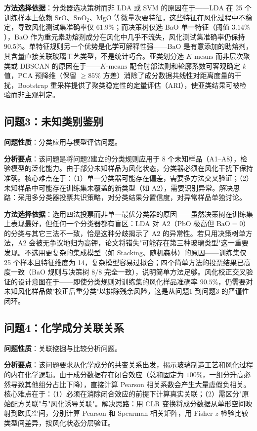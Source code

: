 \textbf{方法选择依据}：分类器选决策树而非 LDA 或 SVM 的原因在于——LDA 在 25 个训练样本上依赖 SrO、$\text{SnO}_2$、MgO 等微量次要特征，这些特征在风化过程中不稳定，导致风化测试集准确率仅 $61.9\%$；而决策树仅选 BaO 单一特征（阈值 $3.14\%$），BaO 作为重元素助熔剂成分在风化中几乎不流失，风化测试集准确率仍保持 $90.5\%$。单特征规则另一个优势是化学可解释性强——BaO 是有意添加的助熔剂，其含量直接关联玻璃工艺类型，不是统计巧合。亚类划分选 $K\text{-means}$ 而非层次聚类或 DBSCAN 的原因在于——$K\text{-means}$ 配合肘部法则和轮廓系数可客观确定 $k$ 值，PCA 预降维（保留 $\geq 85\%$ 方差）消除了成分数据共线性对距离度量的干扰，Bootstrap 重采样提供了聚类稳定性的定量评估（ARI），使亚类结果可被检验而非主观判定。

\subsection{问题3：未知类别鉴别}

\textbf{问题性质}：分类应用与模型评估问题。

\textbf{分析要点}：该问题是将问题2建立的分类规则应用于 8 个未知样品（A1--A8），检验模型的泛化能力。由于部分未知样品为风化状态，分类器必须在风化干扰下保持准确。核心难点在于：（1）单一分类器可能存在偏差，需要多方法交叉验证；（2）未知样品中可能存在训练集未覆盖的新类型（如 A2），需要识别异常。解决思路：采用多分类器投票共识策略，对分类结果分置信度，对异常样品单独讨论。

\textbf{方法选择依据}：选用四法投票而非单一最优分类器的原因——虽然决策树在训练集上表现最好，但任何一个分类器都有盲区：LDA 对 A2（PbO 极高但 $\text{BaO}=0$）的分类与其它三法不一致，恰是这种分歧揭示了 A2 的异常性。若只用决策树单方法，A2 会被无争议地归为高钾，论文将错失"可能存在第三种玻璃类型"这一重要发现。不选用更复杂的集成模型（如 Stacking、随机森林）的原因——训练集仅 25 个样本且特征维度为 14，复杂模型容易过拟合；四个简单方法的投票结果已高度一致（BaO 规则与决策树 8/8 完全一致），说明简单方法足够。风化校正交叉验证的设计意图在于——即使分类规则对训练集的风化样品准确率 $90.5\%$，仍需要对未知风化样品做"校正后重分类"以排除残余风险，这是从问题1 到问题3 的严谨性闭环。

\subsection{问题4：化学成分关联关系}

\textbf{问题性质}：关联挖掘与比较分析问题。

\textbf{分析要点}：该问题要求从化学成分的共变关系出发，揭示玻璃制造工艺和风化过程的内在化学逻辑。由于成分数据存在闭合效应（总和固定为 $100\%$，一组分升高必然导致其他组分占比下降），直接计算 Pearson 相关系数会产生大量虚假负相关。核心难点在于：（1）必须在消除闭合效应的前提下计算真实关联；（2）需区分"原始配方关联"与"风化诱导关联"。解决思路：用 CLR 变换将成分数据从单形空间映射到欧氏空间，分别计算 Pearson 和 Spearman 相关矩阵，用 Fisher $z$ 检验比较类型间差异，按风化状态分层验证。

